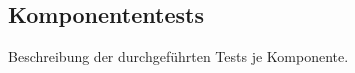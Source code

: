 %



\newpage



\subsection*{Komponententests}
\label{Abschnitt:Tests:Protokoll:Komponenten}

Beschreibung der durchgeführten Tests je Komponente.







